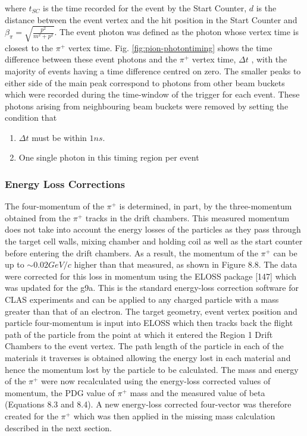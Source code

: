where $t_{SC}$ is the time recorded for the event by the Start Counter, $d$ is the distance between the event vertex and the hit position in the Start Counter  and $\beta_\pi = \sqrt{\frac{p^2}{m^2 + p^2}} $.  The event photon was defined as the photon whose vertex time is closest to the $\pi^+$ vertex time. Fig. \ref{fig:pion-photontiming} shows the time difference between these event photons and the $\pi^+$ vertex time, $\Delta t$ , with the majority of events having a time difference centred on zero. The smaller peaks to either side of the main peak correspond to photons from other beam buckets which were recorded during the time-window of the trigger for each event. These photons arising from neighbouring beam buckets were removed by setting the condition that 
\begin{enumerate}
\item $\Delta t$ must be within $1 ns$. 
\item One single photon in this timing region per event
\end{enumerate}


\subsubsection{Energy Loss Corrections}

The four-momentum of the $\pi^+$ is determined, in part, by the three-momentum obtained from the $\pi^+$ tracks in the drift chambers. This measured momentum does not take into account the energy losses of the particles as they pass through the target cell walls, mixing chamber and holding coil as well as the start counter before entering the drift chambers. As a result, the momentum of the $\pi^+$ can be up to $\sim 0.02 GeV/c$ higher than that measured, as shown in Figure 8.8.
The data were corrected for this loss in momentum using the ELOSS package [147] which was updated for the g9a. This is the standard energy-loss correction software for CLAS experiments and can be applied to any charged particle with a mass greater than that of an electron. The target geometry, event vertex position and particle four-momentum is input into ELOSS which then tracks back the flight path of the particle from the point at which it entered the Region 1 Drift Chambers to the event vertex. The path length of the particle in each of the materials it traverses is obtained allowing the energy lost in each material and hence the momentum lost by the particle to be calculated. The mass and energy of the $\pi^+$ were now recalculated using the energy-loss corrected values of momentum, the PDG value of $\pi^+$ mass and the measured value of beta (Equations 8.3 and 8.4). A new energy-loss corrected four-vector was therefore created for the $\pi^+$ which was then applied in the missing mass calculation described in the next section.

